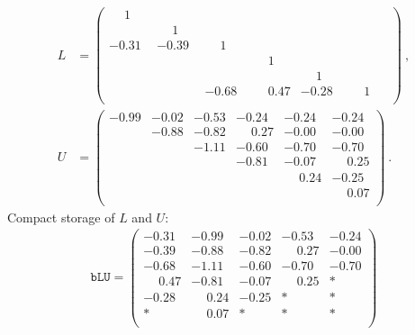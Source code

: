 \documentclass[10pt]{article}
\begin{document}
\begin{align}
L &= \left(
 \begin{array}{cccccc}
\phantom{\phantom{+}}1\phantom{.00}     &       &       &       &       &       \\
      & \phantom{\phantom{+}}1\phantom{.00}     &       &       &       &       \\
-0.31 & -0.39 & \phantom{\phantom{+}}1\phantom{.00}     &       &       &       \\
      &       &       & \phantom{\phantom{+}}1\phantom{.00}     &       &       \\
      &       &       &       & \phantom{\phantom{+}}1\phantom{.00}     &       \\
      &       & -0.68 & \phantom{+}0.47 & -0.28 & \phantom{\phantom{+}}1\phantom{.00}     \\
 \end{array}
 \right)~, \\
U &= \left(
 \begin{array}{cccccc}
-0.99 & -0.02 & -0.53 & -0.24 & -0.24 & -0.24 \\
      & -0.88 & -0.82 & \phantom{+}0.27 & -0.00 & -0.00 \\
      &       & -1.11 & -0.60 & -0.70 & -0.70 \\
      &       &       & -0.81 & -0.07 & \phantom{+}0.25 \\
      &       &       &       & \phantom{+}0.24 & -0.25 \\
      &       &       &       &       & \phantom{+}0.07 \\
 \end{array}
 \right)
 ~.
\end{align}
Compact storage of $L$ and $U$:
\begin{align}
  \texttt{bLU} =
  \left(
  \begin{array}{cccccc}
-0.31 & -0.99 & -0.02 & -0.53 & -0.24 \\
-0.39 & -0.88 & -0.82 & \phantom{+}0.27 & -0.00 \\
-0.68 & -1.11 & -0.60 & -0.70 & -0.70 \\
\phantom{+}0.47 & -0.81 & -0.07 & \phantom{+}0.25 &   *   \\
-0.28 & \phantom{+}0.24 & -0.25 &   *   &   *   \\
  *   & \phantom{+}0.07 &   *   &   *   &   *   \\
  \end{array}
  \right)
\end{align}
\end{document}
